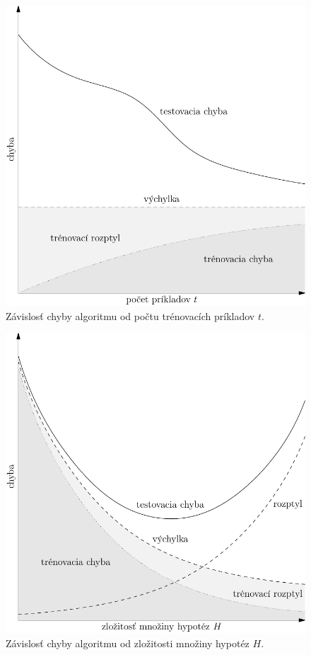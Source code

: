 \begin{figure}
  \centering
  \includegraphics[scale=0.8]{obrazky/krivky1.pdf}
  \caption{Závislosť chyby algoritmu od počtu trénovacích príkladov $t$.}
  \label{img:train}
\end{figure}

\begin{figure}
  \centering
  \includegraphics[scale=0.8]{obrazky/krivky2.pdf}
  \caption{Závislosť chyby algoritmu od zložitosti množiny hypotéz $H$.}
  \label{img:hypo}
\end{figure}

